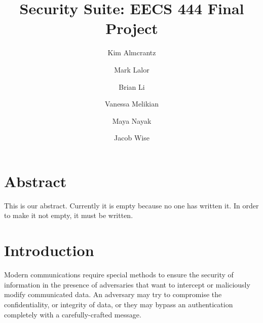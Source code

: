 \documentclass[acmlarge]{acmart}
\begin{document}
\title{Security Suite: EECS 444 Final Project}

\author{Kim Almcrantz}

\author{Mark Lalor}

\author{Brian Li}

\author{Vanessa Melikian}

\author{Maya Nayak}

\author{Jacob Wise}




\maketitle


\section{Abstract}

This is our abstract. Currently it is empty because no one has written it. In order to make it not empty, it must be written.

\section{Introduction}\label{sec:intro}

Modern communications require special methods to ensure the security of information in the presence of adversaries that want to intercept or maliciously modify communicated data. An adversary may try to compromise the confidentiality, or integrity of data, or they may bypass an authentication completely with a carefully-crafted message.
\end{document}
